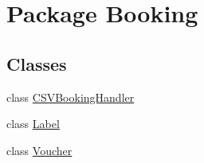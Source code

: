 \hypertarget{namespace_booking}{}\section{Package Booking}
\label{namespace_booking}
\subsection*{Classes}
\begin{DoxyCompactItemize}
\item 
class \hyperlink{class_booking_1_1_c_s_v_booking_handler}{C\+S\+V\+Booking\+Handler}
\item 
class \hyperlink{class_booking_1_1_label}{Label}
\item 
class \hyperlink{class_booking_1_1_voucher}{Voucher}
\end{DoxyCompactItemize}
